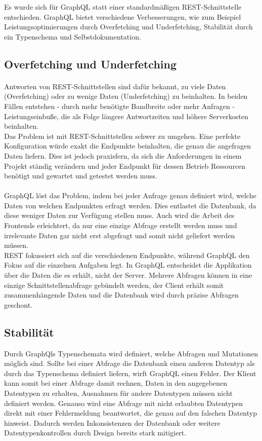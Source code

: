 Es wurde sich für GraphQL statt einer standardmäßigen REST-Schnittstelle entschieden.
GraphQL bietet verschiedene Verbesserungen, wie zum Beispiel Leistungsoptimierungen durch Overfetching und Underfetching, Stabilität durch ein Typenschema und Selbstdokumentation.

\subsection{Overfetching und Underfetching}
\paragraph{}
Antworten von REST-Schnittstellen sind dafür bekannt, zu viele Daten (Overfetching) oder zu wenige Daten (Underfetching) zu beinhalten.
In beiden Fällen entstehen - durch mehr benötigte Bandbreite oder mehr Anfragen - Leistungseinbuße, die als Folge längere Antwortzeiten und höhere Serverkosten beinhalten. \\  %
Das Problem ist mit REST-Schnittstellen schwer zu umgehen.
Eine perfekte Konfiguration würde exakt die Endpunkte beinhalten, die genau die angefragen Daten liefern.
Dies ist jedoch praxisfern, da sich die Anforderungen in einem Projekt ständig verändern und jeder Endpunkt für dessen Betrieb Ressourcen benötigt und gewartet und getestet werden muss.

\paragraph{}
GraphQL löst das Problem, indem bei jeder Anfrage genau definiert wird, welche Daten von welchen Endpunkten erfragt werden.
Dies entlastet die Datenbank, da diese weniger Daten zur Verfügung stellen muss.
Auch wird die Arbeit des Frontends erleichtert, da nur eine einzige Abfrage erstellt werden muss und irrelevante Daten gar nicht erst abgefragt und somit nicht geliefert werden müssen.\\
REST fokussiert sich auf die verschiedenen Endpunkte, während GraphQL den Fokus auf die einzelnen Aufgaben legt.
In GraphQL entscheidet die Applikation über die Daten die es erhält, nicht der Server.
Mehrere Abfragen können in eine einzige Schnittstellenabfrage gebündelt werden, der Client erhält somit zusammenhängende Daten und die Datenbank wird durch präzise Abfragen geschont.

\subsection{Stabilität}
Durch GraphQls Typenschemata wird definiert, welche Abfragen und Mutationen möglich sind.
Sollte bei einer Abfrage die Datenbank einen anderen Datentyp als durch das Typenschema definiert liefern, wirft GraphQL einen Fehler.
Der Klient kann somit bei einer Abfrage damit rechnen, Daten in den angegebenen Datentypen zu erhalten, Ausnahmen für andere Datentypen müssen nicht definiert werden.
Genauso wird eine Abfrage mit nicht erlaubten Datentypen direkt mit einer Fehlermeldung beantwortet, die genau auf den falschen Datentyp hinweist.
Dadurch werden Inkonsistenzen der Datenbank oder weitere Datentypenkontrollen durch Design bereits stark mitigiert.

